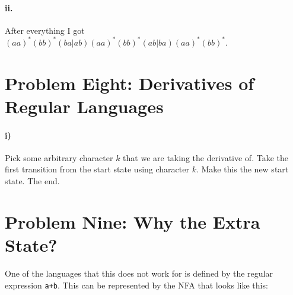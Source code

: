 \documentclass[10pt,letter]{article}
\begin{document}
\paragraph{ii.} After everything I got $(aa)^*(bb)^*(ba|ab)(aa)^*(bb)^*(ab|ba)(aa)^*(bb)^*$.

\section*{Problem Eight: Derivatives of Regular Languages}

\paragraph{i)} Pick some arbitrary character $k$ that we are taking the derivative of. Take the first transition from the start state using character $k$. Make this the new start state. The end.


\section*{Problem Nine: Why the Extra State?} 
One of the languages that this does not work for is defined by the regular expression \texttt{a+b}. This can be represented by the NFA that looks like this:






\end{document}
